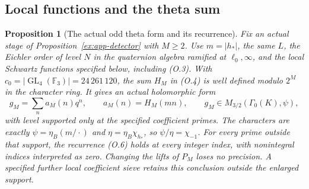 \documentclass[11pt]{article}
\newtheorem{proposition}[theorem]{Proposition}
\theoremstyle{definition}
\theoremstyle{remark}
\newcommand{\F}{\mathbb F}
\begin{document}
\subsection{Local functions and the theta sum}
\begin{proposition}[The actual odd theta form and its recurrence]\label{ex:app-theta-form}
Fix an actual stage of Proposition~\ref{ex:app-detector} with $M\ge2$.
Use $m=|h_*|$, the same $L$, the Eichler order of level $N$ in the
quaternion algebra ramified at $\ell_0,\infty$, and the local
Schwartz functions specified below, including (O.3).
With $c_0=|\operatorname{GL}_4(\F_3)|=24\,261\,120$, the sum
$H_M$ in (O.4) is well defined modulo $2^M$ in the character ring.
It gives an actual holomorphic form
\[
 g_M=\sum_n a_M(n)q^n,\qquad a_M(n)=H_M(mn),
 \qquad g_M\in M_{3/2}(\Gamma_0(K),\psi),
\]
with level supported only at the specified coefficient primes.
The characters are exactly
$\psi=\eta_B(m/\cdot)$ and $\eta=\eta_B\chi_{h_*}$, so
$\psi/\eta=\chi_{-1}$. For every prime outside that support,
the recurrence (O.6) holds at every integer index, with nonintegral
indices interpreted as zero. Changing the lifts of $P_M$ loses no
precision. A specified further local coefficient sieve retains this
conclusion outside the enlarged support.
\end{proposition}
\end{document}
